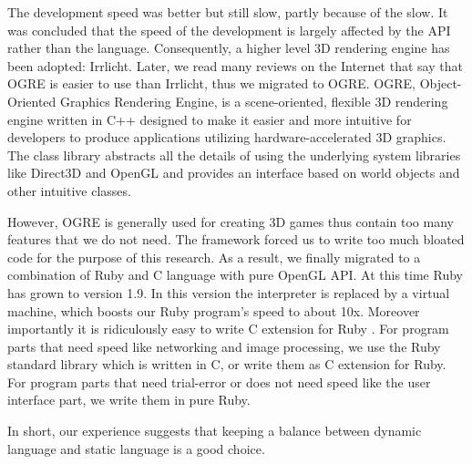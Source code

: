 The development speed was better but still slow, partly because of the slow. It was concluded that the speed of the development is largely affected by the API rather than the language. Consequently, a higher level 3D rendering engine has been adopted: Irrlicht. Later, we read many reviews on the Internet that say that OGRE \cite{Reference11} is easier to use than Irrlicht, thus we migrated to OGRE. OGRE, Object-Oriented Graphics Rendering Engine, is a scene-oriented, flexible 3D rendering engine written in C++ designed to make it easier and more intuitive for developers to produce applications utilizing hardware-accelerated 3D graphics. The class library abstracts all the details of using the underlying system libraries like Direct3D and OpenGL and provides an interface based on world objects and other intuitive classes.

However, OGRE is generally used for creating 3D games thus contain too many features that we do not need. The framework forced us to write too much bloated code for the purpose of this research. As a result, we finally migrated to a combination of Ruby and C language with pure OpenGL API. At this time Ruby has grown to version 1.9. In this version the interpreter is replaced by a virtual machine, which boosts our Ruby program's speed to about 10x. Moreover importantly it is ridiculously easy to write C extension for Ruby \cite{Reference15}. For program parts that need speed like networking and image processing, we use the Ruby standard library which is written in C, or write them as C extension for Ruby. For program parts that need trial-error or does not need speed like the user interface part, we write them in pure Ruby.

In short, our experience suggests that keeping a balance between dynamic language and static language is a good choice.
